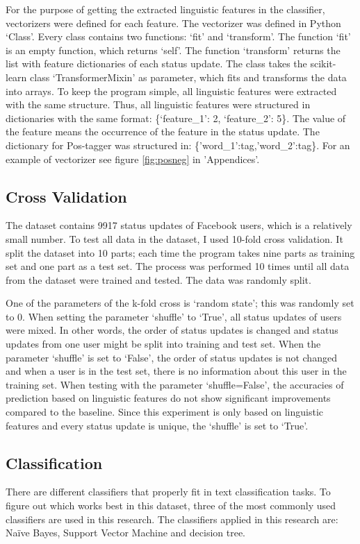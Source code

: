 \documentclass[
10pt, %
a4paper, %
oneside, %
headinclude,footinclude, %
] {book}%
\begin{document}
For the purpose of getting the extracted linguistic features in the classifier, vectorizers were defined for each feature. The vectorizer was defined in Python ‘Class’.  Every class contains two functions: ‘fit’ and ‘transform’. The function ‘fit’ is an empty function, which returns ‘self’. The function ‘transform’ returns the list with feature dictionaries of each status update. The class takes the scikit-learn class ‘TransformerMixin’ as parameter, which fits and transforms the data into arrays.  To keep the program simple, all linguistic features were extracted with the same structure. Thus, all linguistic features were structured in dictionaries with the same format: \{‘feature\_1’: 2, ‘feature\_2’: 5\}. The value of the feature means the occurrence of the feature in the status update. The dictionary for Pos-tagger was structured in: \{'word\_1':tag,'word\_2':tag\}. For an example of vectorizer see figure \ref{fig:posneg} in 'Appendices'.

\subsection{Cross Validation}
The dataset contains 9917 status updates of Facebook users, which is a relatively small number. To test all data in the dataset, I used 10-fold cross validation. It split the dataset into 10 parts; each time the program takes nine parts as training set and one part as a test set. The process was performed 10 times until all data from the dataset were trained and tested. The data was randomly split. 

One of the parameters of the k-fold cross is ‘random state’; this was randomly set to 0. When setting the parameter ‘shuffle' to ‘True', all status updates of users were mixed. In other words, the order of status updates is changed and status updates from one user might be split into training and test set. When the parameter ‘shuffle' is set to ‘False', the order of status updates is not changed and when a user is in the test set, there is no information about this user in the training set. When testing with the parameter ‘shuffle=False’, the accuracies of prediction based on linguistic features do not show significant improvements compared to the baseline. Since this experiment is only based on linguistic features and every status update is unique, the ‘shuffle’ is set to ‘True’.

\subsection{Classification}
There are different classifiers that properly fit in text classification tasks. To figure out which works best in this dataset, three of the most commonly used classifiers are used in this research. The classifiers applied in this research are: Naïve Bayes, Support Vector Machine and decision tree. 
\end{document}
